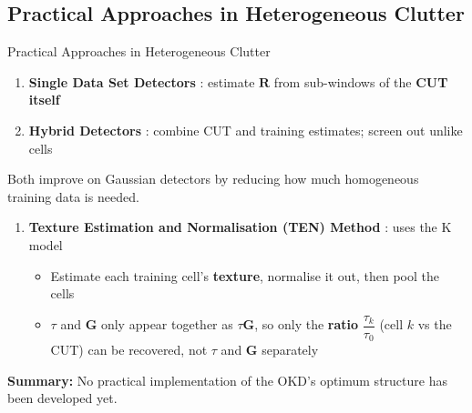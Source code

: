 \documentclass{beamer}
\begin{document}

\subsection{Practical Approaches in Heterogeneous Clutter}
\begin{frame}{Practical Approaches in Heterogeneous Clutter}
    \small
    \begin{enumerate}
        \item \textbf{Single Data Set Detectors} \cite{Aboutanios2005, Aboutanios2019}: estimate $\mathbf{R}$ from sub-windows of the \textbf{CUT itself}
        \item \textbf{Hybrid Detectors} \cite{Aboutanios2010}: combine CUT and training estimates; screen out unlike cells
    \end{enumerate}
    Both improve on Gaussian detectors by reducing how much homogeneous training data is needed.  
    \begin{enumerate}[3]
        \vspace{2mm}
        \item \textbf{Texture Estimation and Normalisation (TEN) Method} \cite{Aboutanios2020}: uses the K model
        \begin{itemize}
            \item Estimate each training cell's \textbf{texture}, normalise it out, then pool the cells
            \item $\tau$ and $\mathbf{G}$ only appear together as $\tau\mathbf{G}$, so only the \textbf{ratio} $\dfrac{\tau_k}{\tau_0}$ (cell $k$ vs the CUT) can be recovered, not $\tau$ and $\mathbf{G}$ separately
        \end{itemize}
    \end{enumerate}
    \vspace{3mm}
    \textbf{Summary: }No practical implementation of the OKD's optimum structure has been developed yet.
\end{frame}
\end{document}
